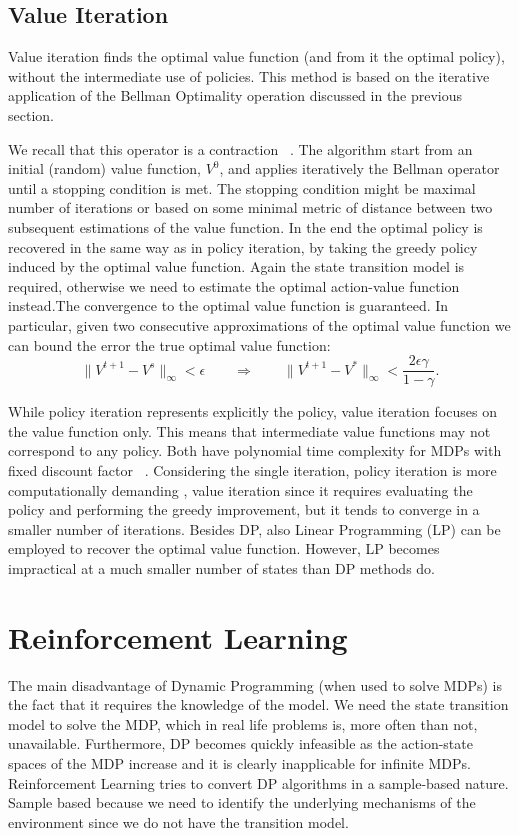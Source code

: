 \subsection{ Value Iteration}
Value iteration finds the optimal value function (and from it the optimal policy), without the intermediate use of policies. This method is based on the iterative application of the Bellman Optimality operation discussed in the previous section.\par
We recall that this operator is a contraction ~\cite{Banach1922}. The algorithm start from an initial (random) value function, $V^0$, and applies iteratively the Bellman operator until a stopping condition is met. The stopping condition might be maximal number of iterations or based on some minimal metric of distance between two subsequent estimations of the value function. In the end the optimal policy is recovered in the same way as in policy iteration, by taking the greedy policy induced by the optimal value function. Again the state transition model is required, otherwise we need to estimate the optimal action-value function instead.The convergence to the optimal value function is guaranteed. In particular, given two consecutive
approximations of the optimal value function we can bound the error \wrt the true optimal value function:
\begin{equation}
\|V^{t+1}-V^{s}\|_{\infty} < \epsilon \qquad \Rightarrow \qquad \|V^{t+1}-V^*\|_{\infty} < \frac{2 \epsilon \gamma}{1- \gamma}.
\end{equation} \par
While policy iteration represents explicitly the policy, value iteration focuses on the value function only. This means that intermediate value functions may not correspond to any policy. Both have polynomial time complexity for MDPs with fixed discount factor ~\cite{DBLP:journals/corr/abs-1301-6718}. Considering the single iteration, policy iteration is more computationally demanding \wrt, value iteration since it requires evaluating the policy and performing the greedy improvement, but it tends to converge in a smaller number of iterations. Besides DP, also Linear Programming (LP) can be employed to recover the optimal value function. However, LP becomes impractical at a much smaller number of states than DP methods do.
\section{Reinforcement Learning} \label{reinforcement_learning}
The main disadvantage of Dynamic Programming (when used to solve MDPs) is the fact that it requires the knowledge of the model. We need the state transition model to solve the MDP, which in real life problems is, more often than not, unavailable. Furthermore, DP becomes quickly infeasible as the action-state spaces of the MDP increase and it is clearly inapplicable for infinite MDPs. Reinforcement Learning tries to  convert DP algorithms in a sample-based nature. Sample based because we need to identify the underlying mechanisms of the environment since we do not have the transition model. 
